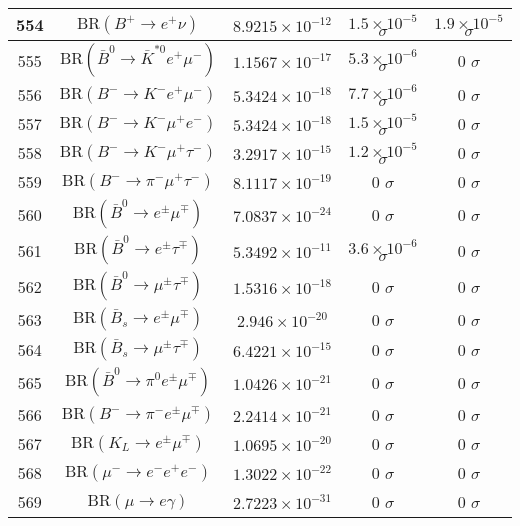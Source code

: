 \begin{longtable}{|c|c|c|c|c|}
554 &	 $\mathrm{BR}(B^+\to e^+\nu)$ &	 $8.9215\times 10^{-12}$ &	 \cellcolor{green!0}$1.5\times 10^{-5}$ $ \sigma$ &	 $1.9\times 10^{-5}$ $ \sigma$ \\ \hline
555 &	 $\mathrm{BR}(\bar B^0\to \bar K^{*0} e^+\mu^-)$ &	 $1.1567\times 10^{-17}$ &	 \cellcolor{red!0}$5.3\times 10^{-6}$ $ \sigma$ &	 0 $ \sigma$ \\ \hline
556 &	 $\mathrm{BR}(B^-\to K^- e^+\mu^-)$ &	 $5.3424\times 10^{-18}$ &	 \cellcolor{red!0}$7.7\times 10^{-6}$ $ \sigma$ &	 0 $ \sigma$ \\ \hline
557 &	 $\mathrm{BR}(B^-\to K^- \mu^+e^-)$ &	 $5.3424\times 10^{-18}$ &	 \cellcolor{red!0}$1.5\times 10^{-5}$ $ \sigma$ &	 0 $ \sigma$ \\ \hline
558 &	 $\mathrm{BR}(B^-\to K^- \mu^+\tau^-)$ &	 $3.2917\times 10^{-15}$ &	 \cellcolor{red!0}$1.2\times 10^{-5}$ $ \sigma$ &	 0 $ \sigma$ \\ \hline
559 &	 $\mathrm{BR}(B^-\to \pi^- \mu^+\tau^-)$ &	 $8.1117\times 10^{-19}$ &	 0 $ \sigma$ &	 0 $ \sigma$ \\ \hline
560 &	 $\mathrm{BR}(\bar B^0\to e^\pm \mu^\mp)$ &	 $7.0837\times 10^{-24}$ &	 0 $ \sigma$ &	 0 $ \sigma$ \\ \hline
561 &	 $\mathrm{BR}(\bar B^0\to e^\pm \tau^\mp)$ &	 $5.3492\times 10^{-11}$ &	 \cellcolor{red!0}$3.6\times 10^{-6}$ $ \sigma$ &	 0 $ \sigma$ \\ \hline
562 &	 $\mathrm{BR}(\bar B^0\to \mu^\pm \tau^\mp)$ &	 $1.5316\times 10^{-18}$ &	 0 $ \sigma$ &	 0 $ \sigma$ \\ \hline
563 &	 $\mathrm{BR}(\bar B_s\to e^\pm \mu^\mp)$ &	 $2.946\times 10^{-20}$ &	 0 $ \sigma$ &	 0 $ \sigma$ \\ \hline
564 &	 $\mathrm{BR}(\bar B_s\to \mu^\pm \tau^\mp)$ &	 $6.4221\times 10^{-15}$ &	 0 $ \sigma$ &	 0 $ \sigma$ \\ \hline
565 &	 $\mathrm{BR}(\bar B^0\to \pi^0 e^\pm\mu^\mp)$ &	 $1.0426\times 10^{-21}$ &	 0 $ \sigma$ &	 0 $ \sigma$ \\ \hline
566 &	 $\mathrm{BR}(B^-\to \pi^- e^\pm\mu^\mp)$ &	 $2.2414\times 10^{-21}$ &	 0 $ \sigma$ &	 0 $ \sigma$ \\ \hline
567 &	 $\mathrm{BR}(K_L\to e^\pm\mu^\mp)$ &	 $1.0695\times 10^{-20}$ &	 0 $ \sigma$ &	 0 $ \sigma$ \\ \hline
568 &	 $\mathrm{BR}(\mu^-\to e^-e^+e^-)$ &	 $1.3022\times 10^{-22}$ &	 0 $ \sigma$ &	 0 $ \sigma$ \\ \hline
569 &	 $\mathrm{BR}(\mu\to e\gamma)$ &	 $2.7223\times 10^{-31}$ &	 0 $ \sigma$ &	 0 $ \sigma$ \\ \hline

\end{longtable}
